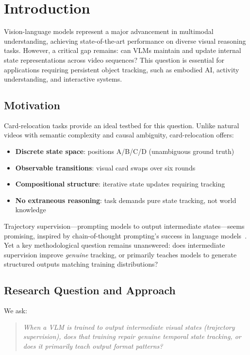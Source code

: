 \section{Introduction}

Vision-language models represent a major advancement in multimodal understanding, achieving state-of-the-art performance on diverse visual reasoning tasks. However, a critical gap remains: can VLMs maintain and update internal state representations across video sequences? This question is essential for applications requiring persistent object tracking, such as embodied AI, activity understanding, and interactive systems.

\subsection{Motivation}

Card-relocation tasks provide an ideal testbed for this question. Unlike natural videos with semantic complexity and causal ambiguity, card-relocation offers:
\begin{itemize}
    \item \textbf{Discrete state space}: positions A/B/C/D (unambiguous ground truth)
    \item \textbf{Observable transitions}: visual card swaps over six rounds
    \item \textbf{Compositional structure}: iterative state updates requiring tracking
    \item \textbf{No extraneous reasoning}: task demands pure state tracking, not world knowledge
\end{itemize}

Trajectory supervision---prompting models to output intermediate states---seems promising, inspired by chain-of-thought prompting's success in language models~\cite{wei2022chain}. Yet a key methodological question remains unanswered: does intermediate supervision improve \emph{genuine} tracking, or primarily teaches models to generate structured outputs matching training distributions?

\subsection{Research Question and Approach}

We ask:
\begin{quote}
\emph{When a VLM is trained to output intermediate visual states (trajectory supervision), does that training repair genuine temporal state tracking, or does it primarily teach output format patterns?}
\end{quote}

